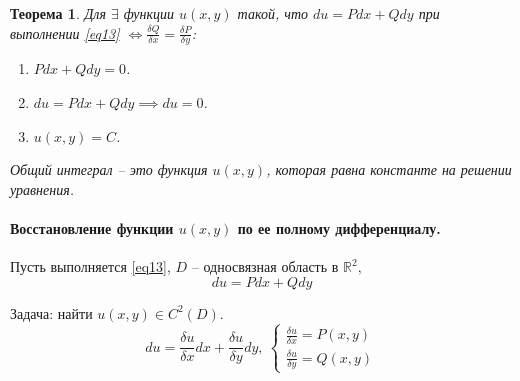 \documentclass[11pt,a4paper,oneside]{report}
\theoremstyle{definition}
\theoremstyle{plain}
\newtheorem{theorem}{Теорема}[section]
\theoremstyle{remark}
\begin{document}
\begin{theorem}
    Для $\exists$ функции $u(x,y)$ такой, что $du = Pdx + Qdy$ при выполнении \ref{eq13} $\iff \frac{\delta Q}{\delta x} = \frac{\delta P}{\delta y}$:
    \begin{enumerate}
        \item $Pdx + Qdy = 0$.
        \item $du = Pdx + Qdy \implies du = 0$.
        \item $u(x,y) = C$.
    \end{enumerate}

    \emph{Общий интеграл} -- это функция $u(x,y)$, которая равна константе на решении уравнения.
\end{theorem}

\paragraph*{Восстановление функции $u(x,y)$ по ее полному дифференциалу.}

Пусть выполняется \ref{eq13}, $D$ -- односвязная область в $\mathbb{R}^2,$
\begin{equation*}
    du = Pdx + Qdy
\end{equation*}

Задача: найти $u(x,y) \in C^2(D)$.
\begin{equation*}
    du = \frac{\delta u}{\delta x}dx + \frac{\delta u}{\delta y}dy, \ \left\{\begin{array}{l}
        \frac{\delta u}{\delta x} = P(x,y) \\
        \frac{\delta u}{\delta y} = Q(x,y)
    \end{array}\right.
\end{equation*}
\end{document}
